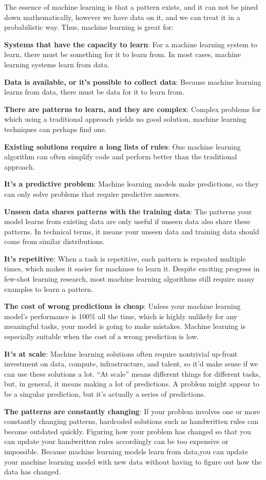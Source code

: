 The essence of machine learning is that a pattern exists, and it can not be pined down mathematically, however we have
data on it, and we can treat it in a probabilistic way. Thus, machine learning is great for:
\bit
\item \textbf{Systems that have the capacity to learn}: For a machine learning system to learn, there must be something
for it to learn from. In most cases, machine learning systems learn from data.
\item \textbf{Data is available, or it's possible to collect data}: Because machine learning learns from data, there
must be data for it to learn from.
\item \textbf{There are patterns to learn, and they are complex}: Complex problems for which using a traditional
approach yields no good solution, machine learning techniques can perhaps find one.
\item \textbf{Existing solutions require a long lists of rules}: One machine learning algorithm can often simplify code
and perform better than the traditional approach.
\item \textbf{It's a predictive problem}: Machine learning models make predictions, so they can only solve problems that
require predictive answers.
\item \textbf{Unseen data shares patterns with the training data}: The patterns your model learns from existing data are
only useful if unseen data also share these patterns. In technical terms, it means your unseen data and training data
should come from similar distributions.
\item \textbf{It's repetitive}: When a task is repetitive, each pattern is repeated multiple times, which makes it
easier for machines to learn it. Despite exciting progress in few-shot learning research, most machine learning
algorithms still require many examples to learn a pattern.
\item \textbf{The cost of wrong predictions is cheap}: Unless your machine learning model's performance is 100\% all the
time, which is highly unlikely for any meaningful tasks, your model is going to make mistakes. Machine learning is
especially suitable when the cost of a wrong prediction is low.
\item \textbf{It's at scale}: Machine learning solutions often require nontrivial up-front investment on data, compute,
infrastructure, and talent, so it'd make sense if we can use these solutions a lot. ``At scale'' means different things
for different tasks, but, in general, it means making a lot of predictions. A problem might appear to be a singular
prediction, but it's actually a series of predictions.
\item \textbf{The patterns are constantly changing}: If your problem involves one or more constantly changing patterns,
hardcoded solutions such as handwritten rules can become outdated quickly. Figuring how your problem has changed so that
you can update your handwritten rules accordingly can be too expensive or impossible. Because machine learning models
learn from data,you can update your machine learning model with new data without having to figure out how the data has
changed.
\eit

